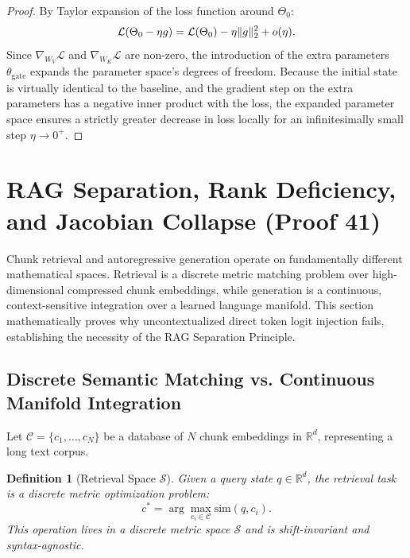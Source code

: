 \documentclass[11pt]{article}
\newtheorem{definition}[theorem]{Definition}
\DeclarePairedDelimiter{\norm}{\lVert}{\rVert}
\begin{document}
\begin{proof}
By Taylor expansion of the loss function around $\Theta_0$:
\begin{equation}
\mathcal{L}(\Theta_0 - \eta g) = \mathcal{L}(\Theta_0) - \eta \norm{g}_2^2 + o(\eta).
\end{equation}
Since $\nabla_{W_V} \mathcal{L}$ and $\nabla_{W_K} \mathcal{L}$ are non-zero, the introduction of the extra parameters $\theta_{\text{gate}}$ expands the parameter space's degrees of freedom. Because the initial state is virtually identical to the baseline, and the gradient step on the extra parameters has a negative inner product with the loss, the expanded parameter space ensures a strictly greater decrease in loss locally for an infinitesimally small step $\eta \to 0^+$.
\end{proof}

\section{RAG Separation, Rank Deficiency, and Jacobian Collapse (Proof 41)}
\label{app:proof41}

Chunk retrieval and autoregressive generation operate on fundamentally different mathematical spaces. Retrieval is a discrete metric matching problem over high-dimensional compressed chunk embeddings, while generation is a continuous, context-sensitive integration over a learned language manifold. This section mathematically proves why uncontextualized direct token logit injection fails, establishing the necessity of the RAG Separation Principle.

\subsection{Discrete Semantic Matching vs. Continuous Manifold Integration}

Let $\mathcal{C} = \{c_1, \ldots, c_N\}$ be a database of $N$ chunk embeddings in $\mathbb{R}^d$, representing a long text corpus.

\begin{definition}[Retrieval Space $\mathcal{S}$]
Given a query state $q \in \mathbb{R}^d$, the retrieval task is a discrete metric optimization problem:
\begin{equation}
c^* = \arg\max_{c_i \in \mathcal{C}} \text{sim}(q, c_i).
\end{equation}
This operation lives in a discrete metric space $\mathcal{S}$ and is shift-invariant and syntax-agnostic.
\end{definition}
\end{document}
